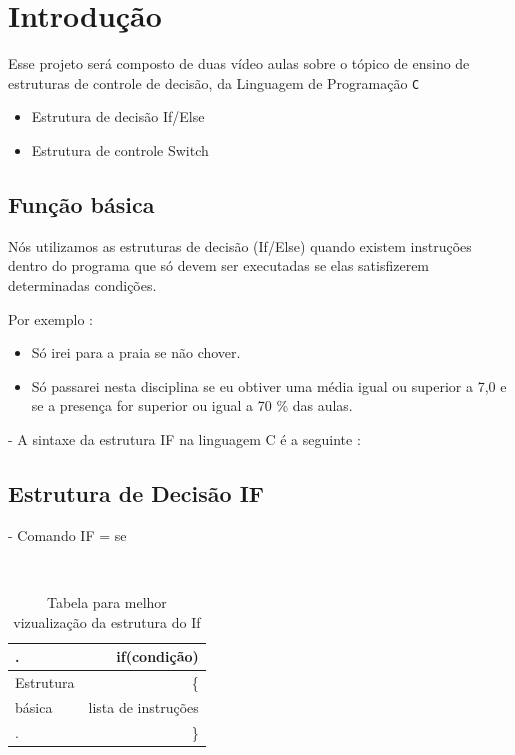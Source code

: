 \documentclass[a4paper,12pt]{article}  %
\begin{document}
\newpage

\section{Introdução}


   Esse projeto será composto de duas vídeo aulas sobre o tópico de ensino de estruturas de controle de decisão,  da Linguagem de Programação \texttt{C}

\begin{itemize}

 \item Estrutura de decisão If/Else
 \item Estrutura de controle Switch
\end{itemize}


 \subsection{Função básica}


    Nós utilizamos as estruturas de decisão (If/Else) quando existem instruções
dentro do programa que só devem ser executadas se elas satisfizerem  
determinadas condições. \newline

Por exemplo :

\begin{itemize}
               
       \item  Só irei para a praia se não chover. 
       \item  Só passarei nesta disciplina se eu obtiver uma média igual ou superior a 7,0 e se a presença for superior ou igual a 70 \% das aulas.
             
\end{itemize}

   - A sintaxe da estrutura IF na linguagem C é a seguinte :
 
 \subsection{Estrutura de Decisão IF}   
       
  -  Comando IF = se
   
  \\
\begin{table}[H]
\begin{center}
 \caption{Tabela para melhor vizualização da estrutura do If}
\begin{tabular}{|l|r|}
  \hline \hline
  
  .          & if(condição) \\ \hline
  Estrutura  &  \{           \\ \hline
    básica   &   lista de instruções  \\ \hline
  .          &  \}             \\ \hline
  
\end{tabular}
\label{tab:resultados}
\end{center}
\end{table}
\end{document}
